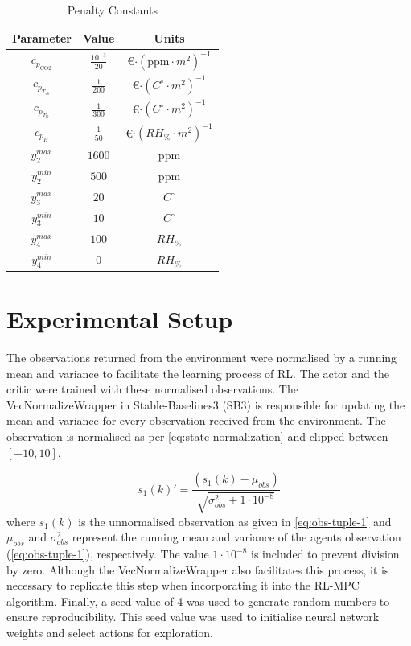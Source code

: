 \begin{table}[h]
	\centering
	\begin{tabular}{|c|c|c|}
		\hline
		\textbf{Parameter} & \textbf{Value} & \textbf{Units} \\
		\hline
		$c_{p_{\text{CO2}}}$ & $\frac{10^{-3}}{20}$ & \euro$\cdot (\text{ppm} \cdot m^2)^{-1}$ \\
		$c_{p_{T_{ub}}}$ & $\frac{1}{200}$ & \euro$\cdot (C^{\circ} \cdot m^2)^{-1}$ \\
		$c_{p_{T_{lb}}}$ & $\frac{1}{300}$ & \euro$\cdot (C^{\circ} \cdot m^2)^{-1}$ \\
		$c_{p_{H}}$ & $\frac{1}{50}$ & \euro$\cdot (RH_{\%} \cdot m^2)^{-1}$ \\
		$y_2^{max}$ & $1600$ & ppm \\
		$y_2^{min}$ & $500$ & ppm \\
		$y_3^{max}$ & $20$ & $C^{\circ}$ \\
		$y_3^{min}$ & $10$ & $C^{\circ}$ \\
		$y_4^{max}$ & $100$ & $RH_{\%}$ \\
		$y_4^{min}$ & $0$ & $RH_{\%}$ \\       
		\hline
	\end{tabular}
	\caption{Penalty Constants}
	\label{tab:pen-constants}
\end{table}




\section{Experimental Setup} \label{section:experimental-setup}
The observations returned from the environment were normalised by a running mean and variance to facilitate the learning process of RL. The actor and the critic were trained with these normalised observations. The VecNormalizeWrapper in Stable-Baselines3 (SB3) \cite{raffinStableBaselines3ReliableReinforcement2021} is responsible for updating the mean and variance for every observation received from the environment. The observation is normalised as per \autoref{eq:state-normalization} and clipped between $[-10,10]$.

\begin{equation}\label{eq:state-normalization}
    s_1(k)' = \frac{(s_1(k) - \mu_{obs}) }{\sqrt{\sigma^2_{obs} + 1\cdot 10^{-8}}}
\end{equation}
where $s_1(k)$ is the unnormalised observation as given in \autoref{eq:obs-tuple-1} and $\mu_{obs}$ and $\sigma^2_{obs}$ represent the running mean and variance of the agents observation (\autoref{eq:obs-tuple-1}), respectively.  The value $1\cdot 10^{-8}$ is included to prevent division by zero. Although the VecNormalizeWrapper also facilitates this process, it is necessary to replicate this step when incorporating it into the RL-MPC algorithm. Finally, a seed value of 4 was used to generate random numbers to ensure reproducibility. This seed value was used to initialise neural network weights and select actions for exploration.

